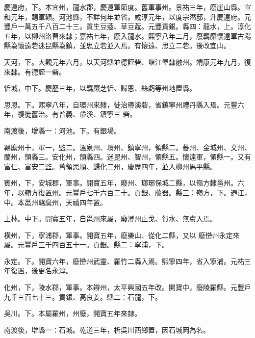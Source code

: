 \begin{pinyinscope}
 慶遠府，下。本宜州，龍水郡，慶遠軍節度。舊軍事州。景祐三年，廢崖山縣。宣和元年，賜軍額。河池縣，不詳何年並省。咸淳元年，以度宗潛邸，升慶遠府。元豐戶一萬五千八百二十三。貢生豆蔻、草豆蔻。元豐貢銀。縣四：龍水，上。淳化五年，以柳州洛曹來隸；嘉祐七年，廢入龍水。熙寧八年二月，廢羈縻懷遠軍古陽縣為懷遠砦迷昆縣為鎮，並思立砦並入焉。有懷遠、思立二砦。後改宜山。



 天河，下。大觀元年六月，以天河縣並德謹砦、堰江堡隸融州。靖康元年九月，復來隸。有德謹一砦。



 忻城，中下。慶歷三年，以羈縻芝忻、歸恩、絲虧等州地置縣。



 思恩。下。熙寧八年，自環州來隸，徙治帶溪砦，省鎮寧州禮丹縣入焉。元豐六年，復徙舊治。有普義、帶溪、鎮寧三
 砦。



 南渡後，增縣一：河池。下。有銀場。



 羈縻州十，軍一，監二。溫泉州、環州、鎮寧州，領縣二。蕃州、金城州、文州、蘭州，領縣三。安化州，領縣四。迷昆州、智州，領縣五。懷遠軍，領縣一。又有富仁、富安二監。舊領思順、歸化二州，慶歷四年，並入柳州馬平縣。



 賓州，下，安城郡，軍事。開寶五年，廢州、瑯琊保城二縣，以嶺方隸邕州。六年，以嶺方復置州。元豐戶七千六百二十。貢銀、藤器。縣三：嶺方，下。遷江，中。本邕州羈縻州，天禧四年置。



 上林。中下。開寶五年，自邕州來屬，廢澄州止戈、賀水、無虞入焉。



 橫州，下，寧浦郡，軍事。開寶五年，廢樂山、從化二縣，又以
 廢巒州永定來屬。元豐戶三千四百五十一。貢銀。縣二：寧浦，下。



 永定。下。開寶六年，廢巒州武靈、羅竹二縣入焉。熙寧四年，省入寧浦。元祐三年復置，後更名永淳。



 化州，下，陵水郡，軍事。本辯州，太平興國五年改。開寶中，廢陵羅縣。元豐戶九千三百七十三。貢銀、高良姜。縣二：石龍，下。



 吳川。下。本屬羅州，州廢，開寶五年來隸。



 南渡後，增縣一：石城。乾道三年，析吳川西鄉置，因石城岡為名。




\end{pinyinscope}
